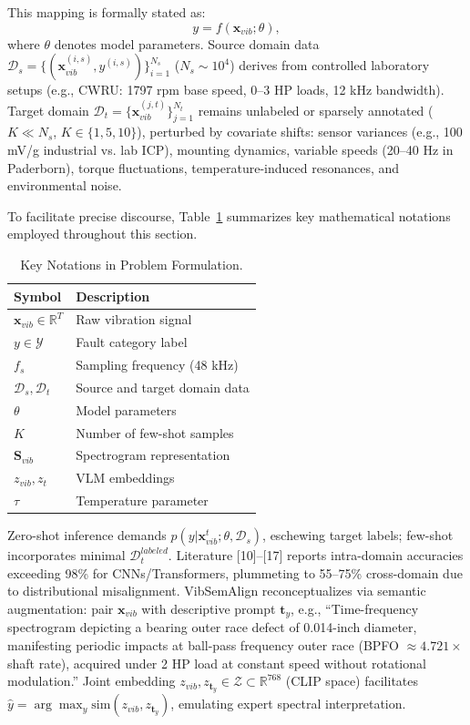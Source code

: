 This mapping is formally stated as:
\begin{equation}
y = f(\mathbf{x}_{vib}; \theta),
\label{eq:f1}
\end{equation}
where $\theta$ denotes model parameters. Source domain data $\mathcal{D}_s = \{(\mathbf{x}_{vib}^{(i,s)}, y^{(i,s)})\}_{i=1}^{N_s}$ ($N_s \sim 10^4$) derives from controlled laboratory setups (e.g., CWRU: 1797 rpm base speed, 0--3 HP loads, 12 kHz bandwidth). Target domain $\mathcal{D}_t = \{\mathbf{x}_{vib}^{(j,t)}\}_{j=1}^{N_t}$ remains unlabeled or sparsely annotated ($K \ll N_s$, $K\in\{1,5,10\}$), perturbed by covariate shifts: sensor variances (e.g., 100 mV/g industrial vs. lab ICP), mounting dynamics, variable speeds (20--40 Hz in Paderborn), torque fluctuations, temperature-induced resonances, and environmental noise.

To facilitate precise discourse, Table~\ref{tab:notation} summarizes key mathematical notations employed throughout this section.

\begin{table}[htbp]
\centering
\caption{Key Notations in Problem Formulation.}
\label{tab:notation}
\begin{tabular}{@{}ll@{}}
\toprule
Symbol & Description \\
\midrule
$\mathbf{x}_{vib} \in \mathbb{R}^T$ & Raw vibration signal \\
$y \in \mathcal{Y}$ & Fault category label \\
$f_s$ & Sampling frequency (48 kHz) \\
$\mathcal{D}_s, \mathcal{D}_t$ & Source and target domain data \\
$\theta$ & Model parameters \\
$K$ & Number of few-shot samples \\
$\mathbf{S}_{vib}$ & Spectrogram representation \\
$z_{vib}, z_t$ & VLM embeddings \\
$\tau$ & Temperature parameter \\
\bottomrule
\end{tabular}
\end{table}

Zero-shot inference demands $p(y|\mathbf{x}_{vib}^t; \theta, \mathcal{D}_s)$, eschewing target labels; few-shot incorporates minimal $\mathcal{D}_t^{labeled}$. Literature [10]--[17] reports intra-domain accuracies exceeding 98\% for CNNs/Transformers, plummeting to 55--75\% cross-domain due to distributional misalignment. VibSemAlign reconceptualizes via semantic augmentation: pair $\mathbf{x}_{vib}$ with descriptive prompt $\mathbf{t}_y$, e.g., ``Time-frequency spectrogram depicting a bearing outer race defect of 0.014-inch diameter, manifesting periodic impacts at ball-pass frequency outer race (BPFO $\approx 4.721 \times$ shaft rate), acquired under 2 HP load at constant speed without rotational modulation.'' Joint embedding $z_{vib}, z_{\mathbf{t}_y} \in \mathcal{Z} \subset \mathbb{R}^{768}$ (CLIP space) facilitates $\hat{y} = \arg\max_y \mathrm{sim}(z_{vib}, z_{\mathbf{t}_y})$, emulating expert spectral interpretation.

